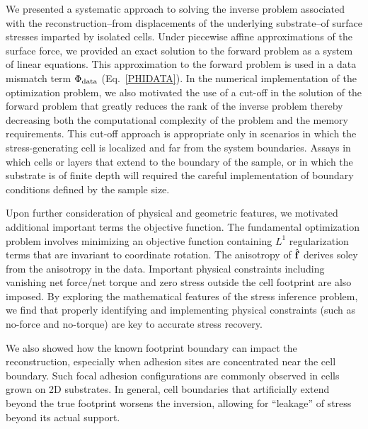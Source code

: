 \documentclass[aps,prl,reprint,twocolumn,groupedaddress,showpacs]{revtex4}
\def\f{{\bf f}}
\begin{document}
We presented a systematic approach to solving the inverse problem
associated with the reconstruction--from displacements of the
underlying substrate--of surface stresses imparted by isolated cells.
Under piecewise affine approximations of the surface force, we
provided an exact solution to the forward problem as a system of
linear equations. This approximation to the forward problem is used in
a data mismatch term $\Phi_{\rm data}$ (Eq.~\ref{PHIDATA}).
In the numerical implementation of the optimization problem, we also
motivated the use of a cut-off in the solution of the forward problem
that greatly reduces the rank of the inverse problem thereby
decreasing both the computational complexity of the problem and the
memory requirements. This cut-off approach is appropriate only in
scenarios in which the stress-generating cell is localized and far
from the system boundaries. Assays in which cells or layers that
extend to the boundary of the sample, or in which the substrate is of
finite depth will required the careful implementation of boundary
conditions defined by the sample size.  

Upon further consideration of physical and geometric features, 
we motivated additional important terms the objective function.   
The fundamental optimization problem involves minimizing an objective
function containing $L^{1}$ regularization terms that are invariant to
coordinate rotation. The anisotropy of $\hat{\f}$ derives soley from
the anisotropy in the data. Important physical constraints including
vanishing net force/net torque and zero stress outside the cell
footprint are also imposed. By exploring the mathematical features of
the stress inference problem, we find that properly identifying and
implementing physical constraints (such as no-force and no-torque) are
key to accurate stress recovery.

We also showed how the known footprint boundary can impact the
reconstruction, especially when adhesion sites are concentrated near
the cell boundary. Such focal adhesion configurations are commonly
observed in cells grown on 2D substrates. In general, cell boundaries
that artificially extend beyond the true footprint worsens the
inversion, allowing for ``leakage'' of stress beyond its actual
support.

\end{document}
